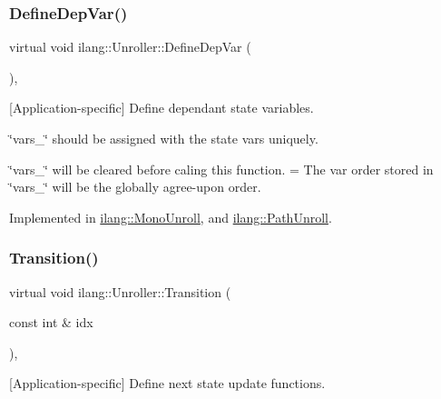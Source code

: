 \subsubsection{\texorpdfstring{Define\+Dep\+Var()}{DefineDepVar()}}
{\footnotesize\ttfamily virtual void ilang\+::\+Unroller\+::\+Define\+Dep\+Var (\begin{DoxyParamCaption}{ }\end{DoxyParamCaption})\hspace{0.3cm}{\ttfamily [protected]}, {}}



\mbox{[}Application-\/specific\mbox{]} Define dependant state variables. 


\begin{DoxyItemize}
\item \char`\"{}vars\+\_\+\char`\"{} should be assigned with the state vars uniquely.
\item \char`\"{}vars\+\_\+\char`\"{} will be cleared before caling this function. = The var order stored in \char`\"{}vars\+\_\+\char`\"{} will be the globally agree-\/upon order. 
\end{DoxyItemize}

Implemented in \mbox{\hyperlink{classilang_1_1_mono_unroll_ab983b89c775ba2d12b5a763ac3391c93}{ilang\+::\+Mono\+Unroll}}, and \mbox{\hyperlink{classilang_1_1_path_unroll_a862b0d21850b43ff4da423eaf37dc18f}{ilang\+::\+Path\+Unroll}}.

\mbox{\label{classilang_1_1_unroller_a18357c55c9aef2627f0d6340f353cf2b}} 
\subsubsection{\texorpdfstring{Transition()}{Transition()}}
{\footnotesize\ttfamily virtual void ilang\+::\+Unroller\+::\+Transition (\begin{DoxyParamCaption}\item[{const int \&}]{idx }\end{DoxyParamCaption})\hspace{0.3cm}{\ttfamily [protected]}, {}}



\mbox{[}Application-\/specific\mbox{]} Define next state update functions. 


